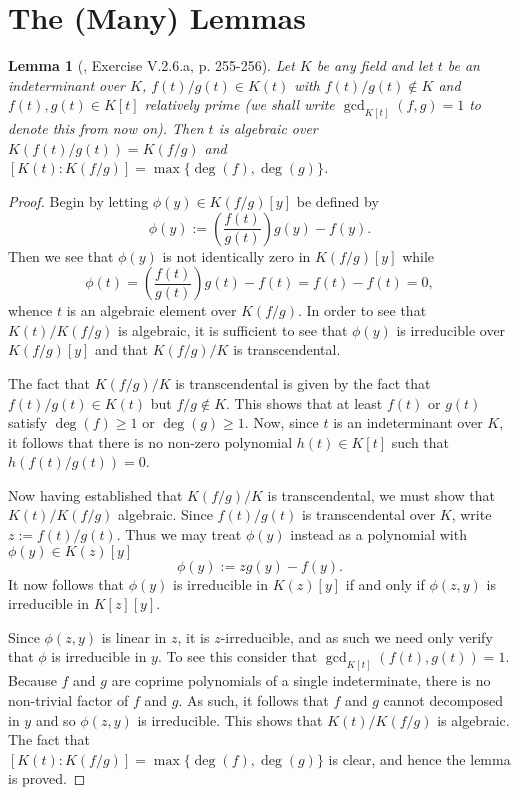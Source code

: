 \documentclass[10pt]{article}
\newtheorem{Lemma}[Theorem]{Lemma}
\numberwithin{Theorem}{section}
\begin{document}
\section{The (Many) Lemmas}
\begin{Lemma}[\cite{Hungerford}, Exercise V.2.6.a, p. 255-256]
Let $K$ be any field and let $t$ be an indeterminant over $K$, $f(t)/g(t) \in K(t)$ with $f(t)/g(t) \notin K$ and $f(t), g(t) \in K[t]$ relatively prime (we shall write $\gcd_{K[t]}(f,g)=1$ to denote this from now on). Then $t$ is algebraic over $K(f(t)/g(t))=K(f/g)$ and $[K(t):K(f/g)] = \max\lbrace \deg(f), \deg(g) \rbrace$. 
\end{Lemma}
\begin{proof}
Begin by letting $\phi(y) \in K(f/g)[y]$ be defined by
$$ \phi(y) := \left(\frac{f(t)}{g(t)}\right)g(y) - f(y).$$
Then we see that $\phi(y)$ is not identically zero in $K(f/g)[y]$ while
$$\phi(t) = \left(\frac{f(t)}{g(t)}\right)g(t) - f(t) = f(t) - f(t) = 0,$$
whence $t$ is an algebraic element over $K(f/g)$. In order to see that $K(t)/K(f/g)$ is algebraic, it is sufficient to see that $\phi(y)$ is irreducible over $K(f/g)[y]$ and that $K(f/g)/K$ is transcendental. 

The fact that $K(f/g)/K$ is transcendental is given by the fact that $f(t)/g(t) \in K(t)$ but $f/g \notin K$. This shows that at least $f(t)$ or $g(t)$ satisfy $\deg(f) \geq 1$ or $\deg(g) \geq 1$. Now, since $t$ is an indeterminant over $K$, it follows that there is no non-zero polynomial $h(t) \in K[t]$ such that $h(f(t)/g(t)) = 0$.

Now having established that $K(f/g)/K$ is transcendental, we must show that $K(t)/K(f/g)$ algebraic. Since $f(t)/g(t)$ is transcendental over $K$, write $z := f(t)/g(t)$. Thus we may treat $\phi(y)$ instead as a polynomial with $\phi(y) \in K(z)[y]$
$$ \phi(y) := zg(y) - f(y).$$
It now follows that $\phi(y)$  is irreducible in $K(z)[y]$ if and only if $\phi(z,y)$ is irreducible in $K[z][y]$. 

Since $\phi(z,y)$ is linear in $z$, it is $z$-irreducible, and as such we need only verify that $\phi$ is irreducible in $y$. To see this consider that $\gcd_{K[t]}(f(t),g(t)) = 1$. Because $f$ and $g$ are coprime polynomials of a single indeterminate, there is no non-trivial factor of $f$ and $g$. As such, it follows that $f$ and $g$ cannot decomposed in $y$ and so $\phi(z,y)$ is irreducible. This shows that $K(t)/K(f/g)$ is algebraic. The fact that \\ $[K(t):K(f/g)] = \max\lbrace\deg(f),\deg(g)\rbrace$ is clear, and hence the lemma is proved.
\end{proof}
\end{document}
